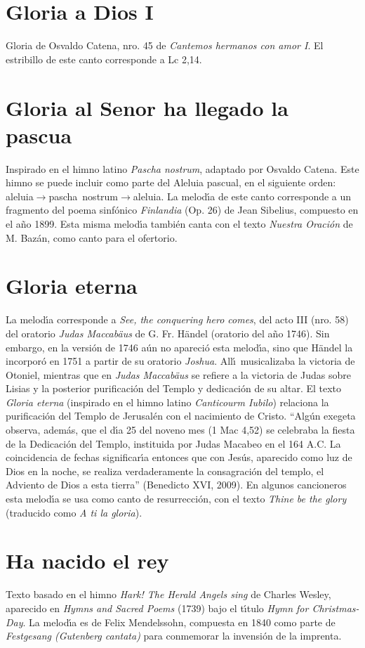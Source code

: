 \documentclass[landscape,12pt]{report}
\begin{document}
\section*{\small Gloria a Dios I} \noindent\footnotesize Gloria de Osvaldo Catena, nro. 45 de \textit{Cantemos hermanos con amor I}. El estribillo de este canto corresponde a Lc 2,14.
\section*{\small Gloria al Senor ha llegado la pascua} \noindent\footnotesize Inspirado en el himno latino \textit{Pascha nostrum}, adaptado por Osvaldo Catena. Este himno se puede incluir como parte del Aleluia pascual, en el siguiente orden: \mbox{aleluia$\rightarrow$pascha nostrum$\rightarrow$aleluia.} La melod\'\i a de este canto corresponde a un fragmento del poema sinf\'onico \emph{Finlandia} (Op. 26) de Jean Sibelius, compuesto en el a\~no 1899. Esta misma melod\'\i a tambi\'en canta con el texto \emph{Nuestra Oraci\'on} de M. Baz\'an, como canto para el ofertorio. 
\section*{\small Gloria eterna} \noindent\footnotesize La melod\'\i a corresponde a \textit{See, the conquering hero comes}, del acto III (nro. 58) del oratorio \textit{Judas Maccab\"aus} de G. Fr. H\"andel (oratorio del a\~no 1746). Sin embargo, en la versi\'on de 1746 a\'un no apareci\'o esta melod\'\i a, sino que H\"andel la incorpor\'o en 1751 a partir de su oratorio \textit{Joshua}.  All\'\i\ musicalizaba la victoria de Otoniel, mientras que en \textit{Judas Maccab\"aus} se refiere a la victoria de Judas sobre Lisias y la posterior purificaci\'on del Templo y dedicaci\'on de su altar. El texto \textit{Gloria eterna} (inspirado en el himno latino \textit{Canticourm Iubilo}) relaciona la purificaci\'on del Templo de Jerusal\'en con el nacimiento de Cristo. ``Alg\'un exegeta observa, adem\'as, que el d\'\i a 25 del noveno mes (1 Mac 4,52) se celebraba la fiesta de la Dedicaci\'on del Templo, instituida por Judas Macabeo en el 164 A.C. La coincidencia de fechas significar\'\i a entonces que con Jes\'us, 
aparecido como luz de Dios en la noche, se realiza verdaderamente la consagraci\'on del templo, el Adviento de Dios a esta tierra'' (Benedicto XVI, 2009). En algunos cancioneros esta melod\'\i a se usa como canto de resurrecci\'on, con el texto \textit{Thine be the glory} (traducido como \textit{A ti la gloria}).
\section*{\small Ha nacido el rey} \noindent\footnotesize Texto basado en el himno \textit{Hark! The Herald Angels sing} de Charles Wesley, aparecido en \textit{Hymns and Sacred Poems} (1739) bajo el t\'\i tulo \textit{Hymn for Christmas-Day}. La melod\'\i a es de Felix Mendelssohn, compuesta en 1840 como parte de \textit{Festgesang (Gutenberg cantata)} para conmemorar la invensi\'on de la imprenta. 
\end{document}
